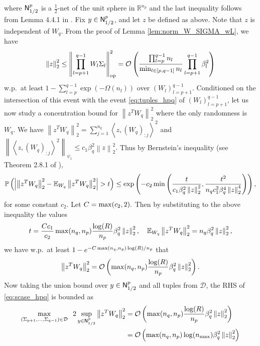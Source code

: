 \documentclass[11pt]{article}
\def\RR{\mathbb{R}}
\newcommand{\E}{\mathbb{E}}
\newcommand{\bigO}[1]{\mathcal{O}\left(#1\right)}
\newcommand{\bigOmg}[1]{\Omega\left(#1\right)}
\newcommand{\inner}[1]{\left\langle#1\right\rangle}
\newcommand{\bigexp}[1]{\exp\left(#1\right)}
\newcommand{\norm}[1]{\left\|#1\right\|}
\newcommand{\abs}[1]{\left|#1\right|}
\def\Bernstein{Theorem 2.8.1 of \cite{vershynin2018high}}
\def\op{\mathrm{op}}
\def\PP{\mathbb{P}}
\def\min{\mathop{\rm min}\nolimits}
\def\max{\mathop{\rm max}\nolimits}
\begin{document}
    where ${\sf N}_{1/2}^{p}$ is a $\frac{1}{2}$-net of the unit sphere in $\RR^{n_p}$ and the last inequality follows from Lemma 4.4.1 in \citep{vershynin2018high}. 
    Fix $y\in {\sf N}_{1/2}^{p}$, and let $z$ be defined as above. Note that $z$ is independent of $W_q$.
    From the proof of Lemma \ref{lem:norm_W_SIGMA_wL}, we have
    \begin{align}\label{eq:sz_hpq}
	\norm{z}_2^2
	\leq\norm{\prod_{l=p+1}^{q-1} W_l\Sigma_l}_{\op}^2
	=\bigO{ \frac{\prod_{l=p}^{q-1} n_l}{\min_{l\in[p,q-1]}n_l} \prod_{l=p+1}^{q-1}\beta_l^2 }
    \end{align}
    w.p.\ at least $1-\sum_{l=p}^{q-1} \bigexp{-\bigOmg{n_l}}$ over $(W_l)_{l=p+1}^{q-1}.$
    Conditioned on the intersection of this event with the event \eqref{eq:tuples_hpq} of $(W_l)_{l=p+1}^{q-1}$,
    let us now study a concentration bound for $\norm{z^TW_q}_2^2$ where the only randomness is $W_q.$
    We have $\norm{z^T W_q}_2^2=\sum_{j=1}^{n_q} \inner{z,(W_q)_{:j}}^2$ 
    and $\norm{\inner{z,(W_q)_{:j}}^2}_{\psi_1}\leq c_1\beta_q^2\norm{z}_2^2.$
    Thus by Bernstein's inequality (see \Bernstein), 
    \begin{align*}
	\PP\left(\abs{\norm{z^T W_q}_2^2-\E_{W_q}\norm{z^T W_q}_2^2}>t\right)
	\leq\bigexp{-c_2\min\left(\frac{t}{c_1\beta_q^2\norm{z}_2^2}, \frac{t^2}{n_q c_1^2\beta_q^4\norm{z}_2^4}\right)},
    \end{align*}
    for some constant $c_2$. 
    Let $C=\max(c_2, 2).$ Then by substituting to the above inequality the values
    \begin{align*}
	t=\frac{Cc_1}{c_2}\max(n_q, n_p)\frac{\log(R)}{n_p}\beta_q^2\norm{z}_2^2,\quad 
	\E_{W_q}\norm{z^T W_q}_2^2=n_q\beta_q^2\norm{z}^2_2 ,
    \end{align*}
    we have w.p.\ at least $1-e^{-C\max(n_q,n_p)\log(R)/n_p}$ that
    \begin{align*}
	\norm{z^T W_q}_2^2=\bigO{ \max(n_q,n_p)\frac{\log(R)}{n_p} \beta_q^2\norm{z}^2_2 }.
    \end{align*}
    Now taking the union bound over $y\in{\sf N}_{1/2}^p$ and all tuples from $\mathcal{D}$,
    the RHS of \eqref{eq:scase_hpq} is bounded as
    \begin{align*}
	\max\limits_{(\Sigma_{p+1},\ldots,\Sigma_{q-1})\in\mathcal{D}}\;\; 2\sup_{y\in{\sf N}_{1/2}^{p}} \norm{z^T W_q}_2^2
	&=\bigO{ \max(n_q,n_p)\frac{\log(R)}{n_p}\beta_q^2\norm{z}^2_2}\\
	&=\bigO{ \max(n_q,n_p) \log(n_{\mathrm{max}}) \beta_q^2\norm{z}^2_2}
    \end{align*}
\end{document}
